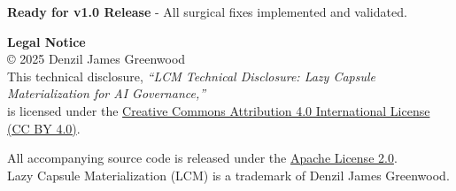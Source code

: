 \documentclass[12pt,a4paper]{article}
\begin{document}
\begin{technicalbox}
\textbf{Ready for v1.0 Release} - All surgical fixes implemented and validated.
\end{technicalbox}

\begin{infobox}
\textbf{Legal Notice}\\
© 2025 Denzil James Greenwood \\
This technical disclosure, \textit{``LCM Technical Disclosure: Lazy Capsule Materialization for AI Governance,''} \\
is licensed under the \href{https://creativecommons.org/licenses/by/4.0/}{Creative Commons Attribution 4.0 International License (CC BY 4.0)}.

All accompanying source code is released under the \href{https://www.apache.org/licenses/LICENSE-2.0}{Apache License 2.0}. \\
Lazy Capsule Materialization (LCM)\texttrademark{} is a trademark of Denzil James Greenwood.
\end{infobox}
\end{document}
